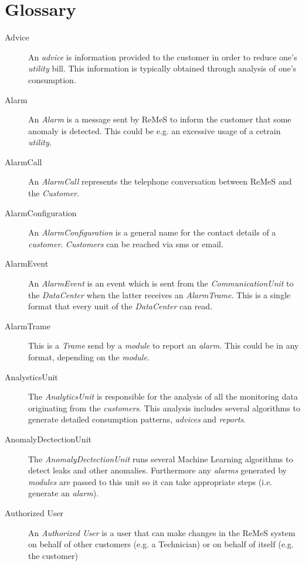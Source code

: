 \chapter{Glossary}
\label{chap:glossary}

\begin{description}
\item[Advice] An \emph{advice} is information provided to the customer in order
to reduce one's \emph{utility} bill. This information is typically obtained through
analysis of one's consumption.

\item[Alarm] An \emph{Alarm} is a message sent by ReMeS to inform the customer
that some anomaly is detected. This could be e.g. an excessive usage of a cetrain
\emph{utility}.

\item[AlarmCall] An \emph{AlarmCall} represents the telephone conversation
between ReMeS and the \emph{Customer}.

\item[AlarmConfiguration] An \emph{AlarmConfiguration} is a general name for the
contact details of a \emph{customer}. \emph{Customers} can be reached via sms or
email.

\item[AlarmEvent] An \emph{AlarmEvent} is an event which is sent from the
\emph{CommunicationUnit} to the \emph{DataCenter} when the latter receives an
\emph{AlarmTrame}. This is a single format that every unit of the
\emph{DataCenter} can read.

\item[AlarmTrame] This is a \emph{Trame} send by a \emph{module} to report an
\emph{alarm}. This could be in any format, depending on the \emph{module}.

\item[AnalysticsUnit] The \emph{AnalyticsUnit} is responsible for the analysis
of all the monitoring data originating from the \emph{customers}. This analysis
includes several algorithms to generate detailed consumption patterns,
\emph{advices} and \emph{reports}. 

\item[AnomalyDectectionUnit] The \emph{AnomalyDectectionUnit} runs several
Machine Learning algorithms to detect leaks and other anomalies. Furthermore any
\emph{alarms} generated by \emph{modules} are passed to this unit so it can take
appropriate steps (i.e. generate an \emph{alarm}).

\item[Authorized User] An \emph{Authorized User} is a user that can make changes
in the ReMeS system on behalf of other customers (e.g. a Technician) or on
behalf of itself (e.g. the customer) %


\end{description}
